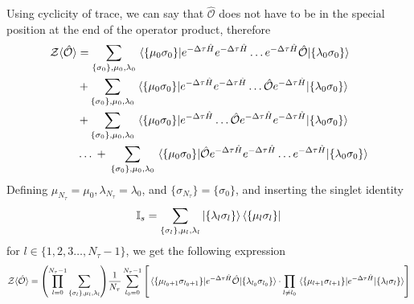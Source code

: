 \documentclass[../thesis_main.tex]{subfiles}
\begin{document}
Using cyclicity of trace, we can say that $\hat{\mathcal{O}}$ does not have to be in the special position at the end of the operator product, therefore
\begin{align*}
    \mathcal{Z} \langle {\hat{\mathcal{O}}} \rangle & = \sum_{\{\sigma_0 \}, \mu_0, \lambda_0} \mel{\{\mu_0 \sigma _0\}}{e^{-\Delta \tau \hat{H}} e^{-\Delta \tau \hat{H}} \ldots e^{-\Delta \tau \hat{H}} \hat{\mathcal{O}}}{\{\lambda_0 \sigma _0\}} \\
    & + \sum_{\{\sigma_0 \}, \mu_0, \lambda_0} \mel{\{\mu_0 \sigma _0\}}{e^{-\Delta \tau \hat{H}} e^{-\Delta \tau \hat{H}} \ldots \hat{\mathcal{O}} e^{-\Delta \tau \hat{H}} }{\{\lambda_0 \sigma _0\}} \\
    & + \sum_{\{\sigma_0 \}, \mu_0, \lambda_0} \mel{\{\mu_0 \sigma _0\}}{e^{-\Delta \tau \hat{H}} \ldots \hat{\mathcal{O}} e^{-\Delta \tau \hat{H}} e^{-\Delta \tau \hat{H}} }{\{\lambda_0 \sigma _0\}} \\
    & \ldots  \: + \: \sum_{\{\sigma_0 \}, \mu_0, \lambda_0} \mel{\{\mu_0 \sigma _0\}}{\hat{\mathcal{O}} e^{-\Delta \tau \hat{H}} e^{-\Delta \tau \hat{H}} \ldots e^{-\Delta \tau \hat{H}}}{\{\lambda_0 \sigma _0\}}
\end{align*}
Defining $\mu_{N_\tau} = \mu_0, \lambda _{N_\tau} = \lambda _0$, and $\{\sigma_{N_\tau}\} = \{\sigma_0\}$, and inserting the singlet identity 
\[
    \mathbb{I}_s = \sum_{\{\sigma_l \}, \mu_l, \lambda_l} \ket{\{\lambda_{l} \sigma_{l}\}}\bra{\{\mu_{l} \sigma_{l}\}}
\] 
for $l \in \{1, 2, 3 \ldots, N_\tau - 1\}$, we get the following expression 
\begin{align}
    \mathcal{Z} \langle \hat{\mathcal{O}} \rangle = \qty(\prod_{l=0}^{N_\tau - 1} \sum_{\{\sigma_l \}, \mu_l, \lambda_l}) \frac{1}{N_\tau} \sum_{l_0 = 0}^{N_\tau - 1} \qty[\mel{\{\mu_{l_0+1} \sigma _{l_0+1}\}}{e^{-\Delta \tau \hat{H}} \hat{\mathcal{O}}}{\{\lambda_{l_0} \sigma _{l_0}\}} \cdot \prod_{l \neq l_0} \mel{\{\mu_{l+1} \sigma _{l+1}\}}{e^{-\Delta \tau \hat{H}}}{\{\lambda_{l} \sigma _{l}\}} ] 
    \label{generalop}
\end{align} 
\end{document}
